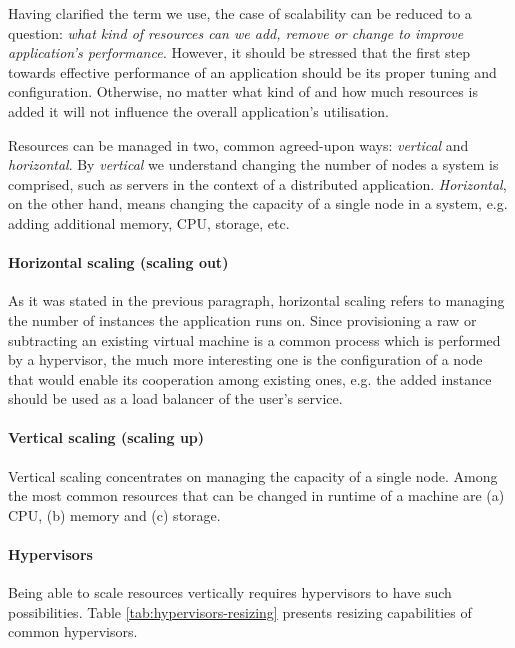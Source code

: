 \documentclass[twocolumn]{svjour3}          %
\begin{document}
Having clarified the term we use, the case of scalability can be reduced to a question: \emph{what kind of resources can we add, remove or change to improve application's performance.} However, it should be stressed that the first step towards effective performance of an application should be its proper tuning and configuration. Otherwise, no matter what kind of and how much resources is added it will not influence the overall application's utilisation.

Resources can be managed in two, common agreed-upon ways: \emph{vertical} and \emph{horizontal}. By \emph{vertical} we understand changing the number of nodes a system is comprised, such as servers in the context of a distributed application. \emph{Horizontal}, on the other hand, means changing the capacity of a single node in a system, e.g. adding additional memory, CPU, storage, etc.

\paragraph{Horizontal scaling (scaling out)} As it was stated in the previous paragraph, horizontal scaling refers to managing the number of instances the application runs on. Since provisioning a raw or subtracting an existing virtual machine is a common process which is performed by a hypervisor, the much more interesting one is the configuration of a node that would enable its cooperation among existing ones, e.g. the added instance should be used as a load balancer of the user's service.

\paragraph{Vertical scaling (scaling up)} Vertical scaling concentrates on managing the capacity of a single node. Among the most common resources that can be changed in runtime of a machine are (a) CPU, (b) memory and (c) storage.



\paragraph{Hypervisors} Being able to scale resources vertically requires hypervisors to have such possibilities. Table \ref{tab:hypervisors-resizing} presents resizing capabilities of common hypervisors.
\end{document}
